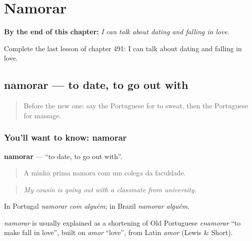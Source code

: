 
\chapter{Namorar}
\label{ch:pt-namorar}

\begin{chapteropening}
\textbf{By the end of this chapter:} \emph{I can talk about dating and falling in love.}

Complete the last lesson of chapter 491: I can talk about dating and falling in love.
\end{chapteropening}

\section[namorar]{namorar — to date, to go out with}

\label{lesson:PT-C491-namorar}



\begin{quote}
Before the new one: say the Portuguese for to sweat, then the Portuguese for massage.
\end{quote}

\subsection*{You'll want to know: namorar}
\textbf{namorar} — \textquotedblleft{}to date, to go out with\textquotedblright{}.

\begin{quote}
A minha prima namora com um colega da faculdade.
\end{quote}

\begin{quote}
\emph{My cousin is going out with a classmate from university.}
\end{quote}

In Portugal \emph{namorar com alguém}; in Brazil \emph{namorar alguém}.

\begin{cousinweb}
\emph{namorar} is usually explained as a shortening of Old Portuguese \emph{enamorar} \textquotedblleft{}to make fall in love\textquotedblright{}, built on \emph{amor} \textquotedblleft{}love\textquotedblright{}, from Latin \emph{amor} (Lewis \& Short).
\end{cousinweb}

